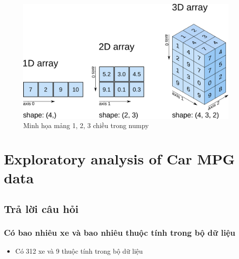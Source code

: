 \documentclass[a4paper, 12pt]{article}
\begin{document}
\begin{enumerate}
        \begin{figure}[H]
            \centering
                \includegraphics[scale=0.2]{img/numpy}
                \caption{Minh họa mảng 1, 2, 3 chiều trong numpy}
        \end{figure}
\end{enumerate}
\clearpage
\section{Exploratory analysis of Car MPG data}

\subsection{Trả lời câu hỏi}
    \subsubsection{Có bao nhiêu xe và bao nhiêu thuộc tính trong bộ dữ liệu}
        \begin{itemize}
            \item Có 312 xe và 9 thuộc tính trong bộ dữ liệu
        \end{itemize}
\end{document}
